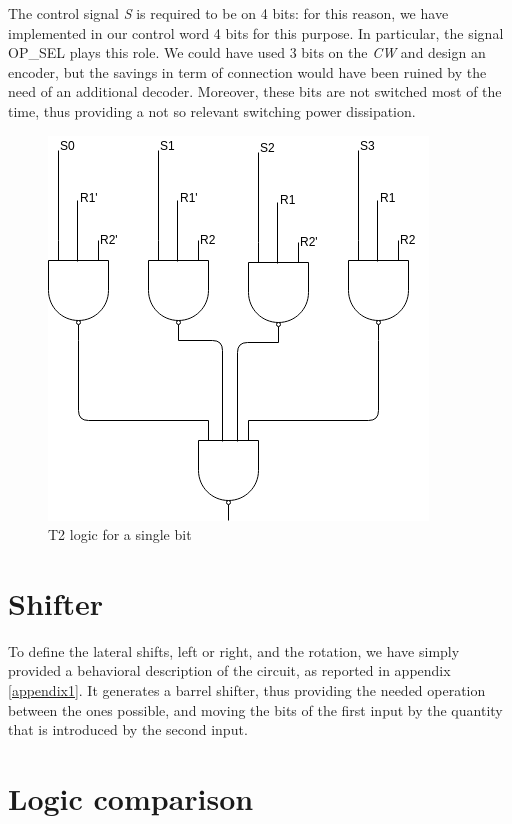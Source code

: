 The control signal \textit{S} is required to be on 4 bits: for this reason, we have implemented in our control word 4 bits for this purpose. In particular, the signal \textsf{OP\_SEL} plays this role. We could have used 3 bits on the \textit{CW} and design an encoder, but the savings in term of connection would have been ruined by the need of an additional decoder. Moreover, these bits are not switched most of the time, thus providing a not so relevant switching power dissipation.

\begin{figure}
	\centering
	\includegraphics[scale=0.6]{chapters/figures/logicT2}
	\caption{T2 logic for a single bit}
	\label{logic_fig}
\end{figure}

\section{Shifter}

To define the lateral shifts, left or right, and the rotation, we have simply provided a behavioral description of the circuit, as reported in appendix \ref{appendix1}. It generates a barrel shifter, thus providing the needed operation between the ones possible, and moving the bits of the first input by the quantity that is introduced by the second input.

\section{Logic comparison}

